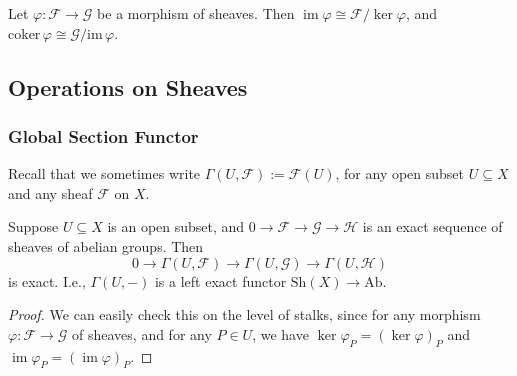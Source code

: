 \documentclass[11pt]{article}
\newcommand{\im}{\operatorname{im}}
\begin{document}
\begin{corollary}
  \cite[Exercise II.1.7]{hartsAG}
  Let $\varphi:\mathscr{F} \to \mathscr{G}$ be a morphism of sheaves. 
  Then $\im\varphi \cong \mathscr{F} / \ker \varphi$, and 
  $\mathrm{coker}\,\varphi \cong \mathscr{G} / \mathrm{im}\,\varphi$. 
\end{corollary}

\begin{proposition}
  \cite[Exercise II.1.9]{hartsAG}
\end{proposition}

\begin{proposition}
  \cite[Exercise II.1.10, 1.11]{hartsAG}
\end{proposition}

\begin{proposition}
  \cite[Exercise II.1.12]{hartsAG}
\end{proposition}



\subsection{Operations on Sheaves}

\subsubsection{Global Section Functor}

Recall that we sometimes write $ \Gamma(U,\mathscr{F}):= \mathscr{F}(U)$, 
for any open subset $ U \subseteq X $ and any sheaf $ \mathscr{F} $ on $ X $. 

\begin{proposition}
  \label{prop: left-exactness of Gamma}
    \cite[Ex 1.8]{hartsAG} 
    Suppose $U \subseteq X$ is an open subset, 
    and $0 \to \mathscr{F} \to \mathscr{G} \to \mathscr{H}$ is an exact sequence 
    of sheaves of abelian groups. 
    Then $$0 \to \Gamma(U,\mathscr{F}) \to \Gamma(U,\mathscr{G}) \to \Gamma(U,\mathscr{H})$$
    is exact. I.e., $ \Gamma(U,-) $  is a left exact functor $\mathrm{Sh}(X) \to \mathrm{Ab}$. 
\end{proposition}

\begin{proof}
  We can easily check this on the level of stalks, 
  since for any morphism $ \varphi: \mathscr{F} \to \mathscr{G} $ of sheaves, 
  and for any $ P \in U $, we have $ \ker \varphi_{P} = (\ker \varphi)_{P} $ and 
  $ \im \varphi_{P} = (\im \varphi)_{P} $.  
\end{proof}
\end{document}
